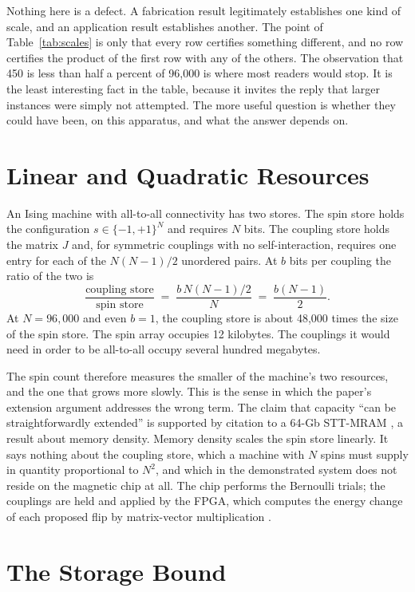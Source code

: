 \documentclass[11pt]{article}
\theoremstyle{definition}
\theoremstyle{remark}
\begin{document}
Nothing here is a defect. A fabrication result legitimately establishes one kind of scale, and an application result establishes another. The point of Table~\ref{tab:scales} is only that every row certifies something different, and no row certifies the product of the first row with any of the others. The observation that 450 is less than half a percent of 96,000 is where most readers would stop. It is the least interesting fact in the table, because it invites the reply that larger instances were simply not attempted. The more useful question is whether they could have been, on this apparatus, and what the answer depends on.

\section{Linear and Quadratic Resources}

An Ising machine with all-to-all connectivity has two stores. The spin store holds the configuration $s \in \{-1,+1\}^N$ and requires $N$ bits. The coupling store holds the matrix $J$ and, for symmetric couplings with no self-interaction, requires one entry for each of the $N(N-1)/2$ unordered pairs. At $b$ bits per coupling the ratio of the two is
\begin{equation}
\frac{\text{coupling store}}{\text{spin store}} \;=\; \frac{b\,N(N-1)/2}{N} \;=\; \frac{b(N-1)}{2}.
\end{equation}
At $N = 96{,}000$ and even $b = 1$, the coupling store is about 48,000 times the size of the spin store. The spin array occupies 12 kilobytes. The couplings it would need in order to be all-to-all occupy several hundred megabytes.

The spin count therefore measures the smaller of the machine's two resources, and the one that grows more slowly. This is the sense in which the paper's extension argument addresses the wrong term. The claim that capacity ``can be straightforwardly extended'' is supported by citation to a 64-Gb STT-MRAM \cite{hatsuda2025,li2026}, a result about memory density. Memory density scales the spin store linearly. It says nothing about the coupling store, which a machine with $N$ spins must supply in quantity proportional to $N^2$, and which in the demonstrated system does not reside on the magnetic chip at all. The chip performs the Bernoulli trials; the couplings are held and applied by the FPGA, which computes the energy change of each proposed flip by matrix-vector multiplication \cite{li2026}.

\section{The Storage Bound}
\end{document}
